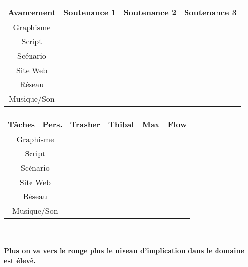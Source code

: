 \documentclass[12pt,a4paper]{article}
\begin{document}
\paragraph{}
\begin{center}
\begin{tabular}{|c|c|c|c|}
\hline 
\rowcolor{cyan} Avancement & Soutenance 1 & Soutenance 2 & Soutenance 3 \\ 
\hline 
\cellcolor{lightgray}Graphisme & \cellcolor{yellow} &  &  \\ 
\hline 
\cellcolor{lightgray}Script & \cellcolor{yellow} &  &  \\ 
\hline 
\cellcolor{lightgray}Scénario & \cellcolor{orange} &  &  \\ 
\hline 
\cellcolor{lightgray}Site Web & \cellcolor{yellow} &  &  \\ 
\hline
\cellcolor{lightgray}Réseau & \cellcolor{yellow} &  &  \\ 
\hline 
\cellcolor{lightgray}Musique/Son &  &  &  \\ 
\hline 
\end{tabular}
\paragraph{}
\begin{tabular}{|c|c|c|c|c|}
 \hline 
 \rowcolor{cyan}Tâches \ Pers. & Trasher & Thibal & Max & Flow \\ 
 \hline 
 \cellcolor{lightgray}Graphisme & \cellcolor{red} &  &  & \cellcolor{yellow} \\ 
 \hline 
 \cellcolor{lightgray}Script &  & \cellcolor{yellow} & \cellcolor{red} & \cellcolor{yellow} \\ 
 \hline 
 \cellcolor{lightgray}Scénario & \cellcolor{yellow} & \cellcolor{yellow} & \cellcolor{yellow} & \cellcolor{yellow} \\ 
 \hline 
 \cellcolor{lightgray}Site Web &  & \cellcolor{red} &  &  \\ 
 \hline 
 \cellcolor{lightgray} Réseau & \cellcolor{orange} &  & \cellcolor{yellow} & \cellcolor{orange} \\ 
 \hline 
 \cellcolor{lightgray}Musique/Son &  & \cellcolor{yellow} &  & \cellcolor{yellow} \\ 
 \hline 
 \end{tabular}
 \
\paragraph{Plus on va vers le rouge plus le niveau d'implication dans le domaine est élevé.} 
\paragraph{}
 \begin{tabular}{|c|c|c|c|}
 \hline 
\cellcolor{white} & \cellcolor{yellow} & \cellcolor{orange} & \cellcolor{red} \\ 
 \hline 
 \end{tabular}

\end{center}
\newpage
\end{document}
